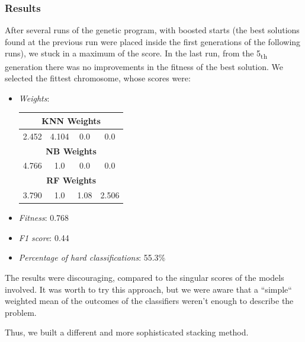 \subsubsection{Results}
After several runs of the genetic program, with boosted starts (the best solutions found at the previous run were placed inside the first generations of the following runs), we stuck in a maximum of the score.
In the last run, from the 5\textsubscript{th} generation there was no improvements in the fitness of the best solution. We selected the fittest chromosome, whose scores were:
\begin{itemize}
	\item[\PencilRight] \textit{Weights}:
	
	\begin{center}
		\begin{tabular}{@{}c|c|c|c@{}}
			\hline\hline
			\multicolumn{4}{c}{\textbf{KNN Weights}}\\
			\hline
			\multicolumn{1}{c|}{2.452}&
			\multicolumn{1}{c|}{4.104}&
			\multicolumn{1}{c|}{0.0}&
			\multicolumn{1}{c}{0.0}\\
			\hline
			\multicolumn{4}{c}{\textbf{NB Weights}}\\
			\hline
			\multicolumn{1}{c|}{4.766}&
			\multicolumn{1}{c|}{1.0}&
			\multicolumn{1}{c|}{0.0}&
			\multicolumn{1}{c}{0.0}\\
			\hline
			\multicolumn{4}{c}{\textbf{RF Weights}}\\
			\hline
			\multicolumn{1}{c|}{3.790}&
			\multicolumn{1}{c|}{1.0}&
			\multicolumn{1}{c|}{1.08}&
			\multicolumn{1}{c}{2.506}\\
			\hline\hline
		\end{tabular}
	\end{center}
	\item[\PencilRight] \textit{Fitness}: 0.768
	\item[\PencilRight] \textit{F1 score}: 0.44
	\item[\PencilRight] \textit{Percentage of hard classifications}: 55.3\%
\end{itemize}

The results were discouraging, compared to the singular scores of the models involved.
It was worth to try this approach, but we were aware that a ``simple`` weighted mean of the outcomes of the classifiers weren't enough to describe the problem.

Thus, we built a different and more sophisticated stacking method.

